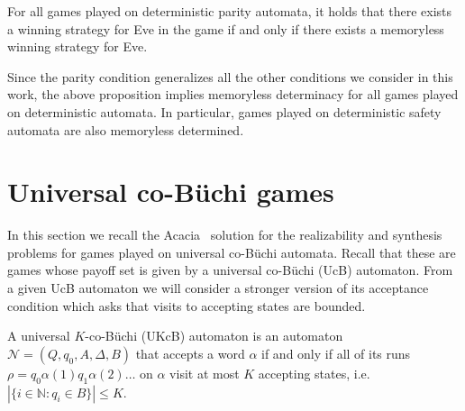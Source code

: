 \documentclass[runningheads,a4paper,draft]{llncs}
\newcommand{\eve}{Eve\xspace}
\newcommand{\calN}{\mathcal{N}}
\begin{document}
\begin{proposition}
  For all games played on deterministic parity automata, it holds that there
  exists a winning strategy for \eve in the game if and only if there exists a
  memoryless winning strategy for \eve.
\end{proposition}
Since the parity condition generalizes all the other conditions we consider in
this work, the above proposition implies memoryless determinacy for all games
played on deterministic automata. In particular, games played on deterministic
safety automata are also memoryless determined.

\section{Universal co-B\"uchi games}
In this section we recall the Acacia~\cite{acacia} solution for the
realizability and synthesis problems for games played on universal co-B\"uchi
automata. Recall that these are games whose payoff set is given by a universal
co-B\"uchi (UcB) automaton.  From a given UcB automaton we will consider a
stronger version of its acceptance condition which asks that visits to
accepting states are bounded.

\begin{definition}
  A universal $K$-co-B\"uchi (UKcB) automaton is an automaton $\calN =
  (Q,q_0,A,\Delta,B)$ that accepts a word $\alpha$ if and only if all of its
  runs $\rho = q_0 \alpha(1) q_1 \alpha(2) \dots$
  on $\alpha$ visit at most $K$ accepting states, i.e. $|\{i \in \mathbb{N} :
  q_i \in B\}| \le K$.
\end{definition}
\end{document}
